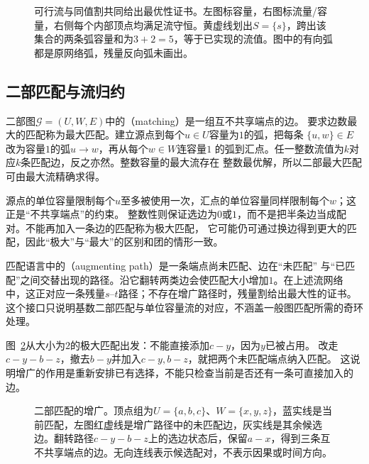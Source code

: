 \begin{figure}[htbp]
  \centering
  
  \caption{可行流与同值割共同给出最优性证书。左图标容量，右图标流量/容量，右侧每个内部顶点均满足流守恒。黄虚线划出\(S=\{s\}\)，跨出该集合的两条弧容量和为\(3+2=5\)，等于已实现的流值。图中的有向弧都是原网络弧，残量反向弧未画出。}
  \label{fig:graph-theory-flow-cut-certificate}
\end{figure}

\subsection{二部匹配与流归约}

二部图\(\mathcal{G}=(U,W,E)\)中的（matching）是一组互不共享端点的边。
要求边数最大的匹配称为最大匹配。建立源点到每个\(u\in U\)容量为\(1\)的弧，把每条
\(\{u,w\}\in E\)改为容量\(1\)的弧\(u\to w\)，再从每个\(w\in W\)连容量\(1\)
的弧到汇点。任一整数流值为\(k\)对应\(k\)条匹配边，反之亦然。整数容量的最大流存在
整数最优解，所以二部最大匹配可由最大流精确求得。

源点的单位容量限制每个\(u\)至多被使用一次，汇点的单位容量同样限制每个\(w\)；这正是“不共享端点”的约束。
整数性则保证选边为\(0\)或\(1\)，而不是把半条边当成配对。不能再加入一条边的匹配称为极大匹配，
它可能仍可通过换边得到更大的匹配，因此“极大”与“最大”的区别和团的情形一致。

匹配语言中的（augmenting path）是一条端点尚未匹配、边在“未匹配”
与“已匹配”之间交替出现的路径。沿它翻转两类边会使匹配大小增加\(1\)。在上述流网络
中，这正对应一条残量\(s\)--\(t\)路径；不存在增广路径时，残量割给出最大性的证书。
这个接口只说明基数二部匹配与单位容量流的对应，不涵盖一般图匹配所需的奇环处理。

图~\ref{fig:graph-theory-matching-augmentation}从大小为\(2\)的极大匹配出发：不能直接添加\(c-y\)，因为\(y\)已被占用。
改走\(c-y-b-z\)，撤去\(b-y\)并加入\(c-y,b-z\)，就把两个未匹配端点纳入匹配。
这说明增广的作用是重新安排已有选择，不能只检查当前是否还有一条可直接加入的边。

\begin{figure}[htbp]
  \centering
  
  \caption{二部匹配的增广。顶点组为\(U=\{a,b,c\}\)、\(W=\{x,y,z\}\)，蓝实线是当前匹配，左图红虚线是增广路径中的未匹配边，灰实线是其余候选边。翻转路径\(c-y-b-z\)上的选边状态后，保留\(a-x\)，得到三条互不共享端点的边。无向连线表示候选配对，不表示因果或时间方向。}
  \label{fig:graph-theory-matching-augmentation}
\end{figure}

